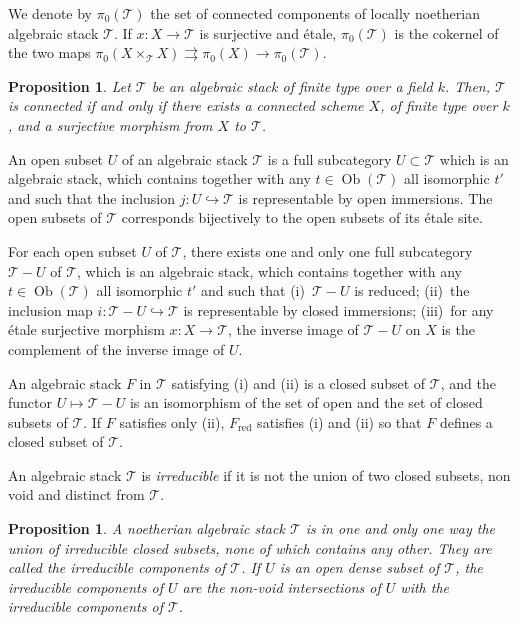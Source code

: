 \documentclass[10pt]{amsart}
\theoremstyle{plain}
\newtheorem{proposition}[theorem]{Proposition}
\theoremstyle{definition}
\DeclareMathOperator{\red}{red}
\DeclareMathOperator{\Ob}{Ob}
\begin{document}
We denote by $\pi_0(\mathscr{T})$ the set of connected components of locally noetherian algebraic stack $\mathscr{T}$. If $x: X \to \mathscr{T}$ is surjective and \'etale, $\pi_0(\mathscr{T})$ is the cokernel of the two maps $\pi_0(X \times_{\mathscr{T}} X) \rightrightarrows \pi_0(X) \to \pi_0(\mathscr{T})$.

\begin{proposition}\label{prop:4.14}
Let $\mathscr{T}$ be an algebraic stack of finite type over a field $k$. Then, $\mathscr{T}$ is connected if and only if there exists a connected scheme $X$, of finite type over $k$, and a surjective morphism from $X$ to $\mathscr{T}$.
\end{proposition}

An open subset $U$ of an algebraic stack $\mathscr{T}$ is a full subcategory $U \subset \mathscr{T}$ which is an algebraic stack, which contains together with any $t \in \Ob(\mathscr{T})$ all isomorphic $t'$ and such that the inclusion $j: U \hookrightarrow \mathscr{T}$ is representable by open immersions. The open subsets of $\mathscr{T}$ corresponds bijectively to the open subsets of its \'etale site.

For each open subset $U$ of $\mathscr{T}$, there exists one and only one full subcategory $\mathscr{T} - U$ of $\mathscr{T}$, which is an algebraic stack, which contains together with any $t \in \Ob(\mathscr{T})$ all isomorphic $t'$ and such that (i)~$\mathscr{T} - U$ is reduced; (ii)~the inclusion map $i: \mathscr{T} - U \hookrightarrow \mathscr{T}$ is representable by closed immersions; (iii)~for any \'etale surjective morphism $x: X \to \mathscr{T}$, the inverse image of $\mathscr{T} - U$ on $X$ is the complement of the inverse image of $U$.

An algebraic stack $F$ in $\mathscr{T}$ satisfying (i) and (ii) is a closed subset of $\mathscr{T}$, and the functor $U \mapsto \mathscr{T} - U$ is an isomorphism of the set of open and the set of closed subsets of $\mathscr{T}$. If $F$ satisfies only (ii), $F_{\red}$ satisfies (i) and (ii) so that $F$ defines a closed subset of $\mathscr{T}$.

An algebraic stack $\mathscr{T}$ is \emph{irreducible} if it is not the union of two closed subsets, non void and distinct from $\mathscr{T}$.

\begin{proposition}\label{prop:4.15}
A noetherian algebraic stack $\mathscr{T}$ is in one and only one way the union of irreducible closed subsets, none of which contains any other. They are called the irreducible components of $\mathscr{T}$. If $U$ is an open dense subset of $\mathscr{T}$, the irreducible components of $U$ are the non-void intersections of $U$ with the irreducible components of $\mathscr{T}$.
\end{proposition}
\end{document}
